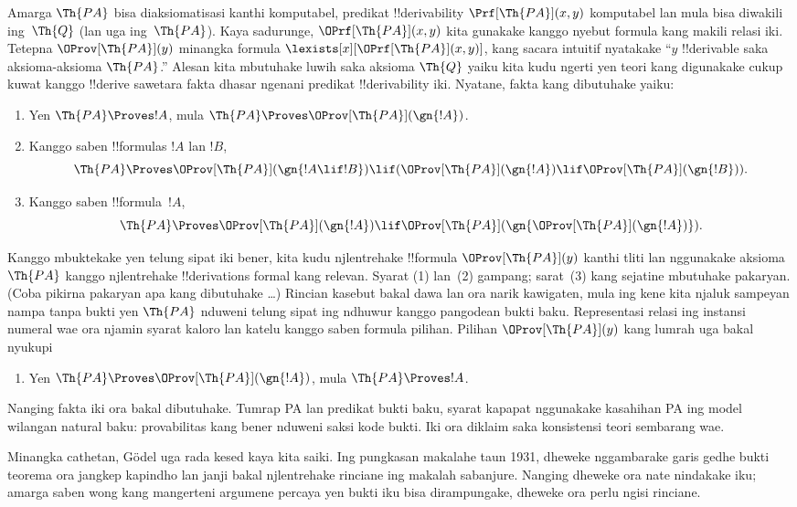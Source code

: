 \documentclass[../../../include/open-logic-section]{subfiles}
\begin{document}
Amarga $\Th{PA}$ bisa diaksiomatisasi kanthi komputabel, predikat
!!{derivability} $\Prf[\Th{PA}](x,y)$ komputabel lan mula bisa
diwakili ing~$\Th{Q}$ (lan uga ing~$\Th{PA}$). Kaya
sadurunge, $\OPrf[\Th{PA}](x,y)$ kita gunakake kanggo nyebut formula
kang makili relasi iki. Tetepna $\OProv[\Th{PA}](y)$
minangka formula $\lexists[x][\OPrf[\Th{PA}](x,y)]$, kang sacara
intuitif nyatakake ``$y$ !!{derivable} saka aksioma-aksioma
$\Th{PA}$.'' Alesan kita mbutuhake luwih saka aksioma $\Th{Q}$
yaiku kita kudu ngerti yen teori kang digunakake cukup kuwat
kanggo !!{derive} sawetara fakta dhasar ngenani predikat
!!{derivability} iki. Nyatane, fakta kang dibutuhake yaiku:
\begin{enumerate}
\item[P1.] Yen $\Th{PA} \Proves !A$, mula $\Th{PA} \Proves
  \OProv[\Th{PA}](\gn{!A})$.
\item[P2.] Kanggo saben !!{formula}s $!A$ lan $!B$,
  \[
  \Th{PA} \Proves \OProv[\Th{PA}](\gn{!A \lif !B}) \lif
  (\OProv[\Th{PA}](\gn{!A}) \lif \OProv[\Th{PA}](\gn{!B})).
  \]
\item[P3.] Kanggo saben !!{formula}~$!A$,
  \[
  \Th{PA} \Proves \OProv[\Th{PA}](\gn{!A})
  \lif \OProv[\Th{PA}](\gn{\OProv[\Th{PA}](\gn{!A})}).
  \]
\end{enumerate}
Kanggo mbuktekake yen telung sipat iki bener, kita kudu njlentrehake
!!{formula} $\OProv[\Th{PA}](y)$ kanthi tliti lan nggunakake aksioma
$\Th{PA}$ kanggo njlentrehake !!{derivation}s formal kang relevan.
Syarat (1) lan~(2) gampang; sarat~(3) kang sejatine mbutuhake
pakaryan. (Coba pikirna pakaryan apa kang dibutuhake \dots)
Rincian kasebut bakal dawa lan ora narik kawigaten, mula ing kene
kita njaluk sampeyan nampa tanpa bukti yen $\Th{PA}$ nduweni telung
sipat ing ndhuwur kanggo pangodean bukti baku. Representasi relasi ing instansi numeral wae ora njamin syarat kaloro lan katelu kanggo saben formula pilihan. Pilihan $\OProv[\Th{PA}](y)$ kang lumrah uga
bakal nyukupi
\begin{enumerate}
\item[P4.] Yen $\Th{PA} \Proves \OProv[\Th{PA}](\gn{!A})$, mula
  $\Th{PA} \Proves !A$.
\end{enumerate}
Nanging fakta iki ora bakal dibutuhake. Tumrap PA lan predikat bukti baku, syarat kapapat nggunakake kasahihan PA ing model wilangan natural baku: provabilitas kang bener nduweni saksi kode bukti. Iki ora diklaim saka konsistensi teori sembarang wae.

\begin{digress}
Minangka cathetan, G\"odel uga rada kesed kaya kita saiki. Ing
pungkasan makalahe taun 1931, dheweke nggambarake garis gedhe bukti
teorema ora jangkep kapindho lan janji bakal njlentrehake rinciane
ing makalah sabanjure. Nanging dheweke ora nate nindakake iku;
amarga saben wong kang mangerteni argumene percaya yen bukti iku
bisa dirampungake, dheweke ora perlu ngisi rinciane.
\end{digress}
\end{document}
